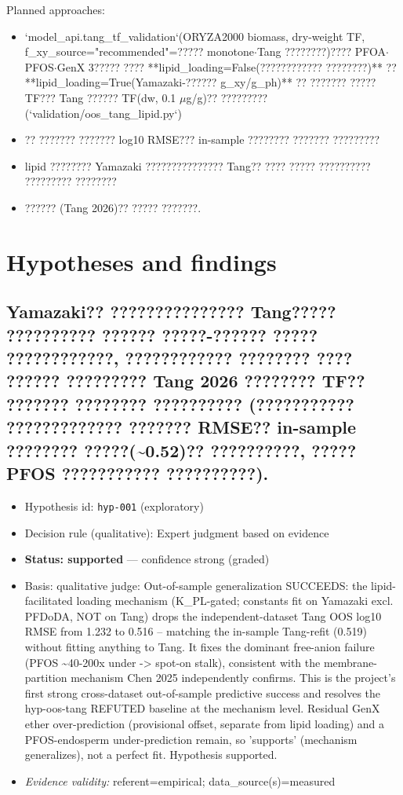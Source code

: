 \documentclass{article}
\begin{document}
Planned approaches:
\begin{itemize}
  \item `model\_api.tang\_tf\_validation`(ORYZA2000 biomass, dry-weight TF, f\_xy\_source="recommended"=?????
monotone$\cdot$Tang ????????)???? PFOA$\cdot$PFOS$\cdot$GenX 3????? ???? **lipid\_loading=False(???????????? ????????)** ??
**lipid\_loading=True(Yamazaki-?????? g\_xy/g\_ph)** ?? ??????? ????? TF??? Tang ?????? TF(dw, 0.1 $\mu$g/g)??
?????????(`validation/oos\_tang\_lipid.py`)
  \item ?? ??????? ??????? log10 RMSE??? in-sample ???????? ???????
?????????
  \item lipid ???????? Yamazaki ??????????????? Tang?? ???? ????? ?????????? ????????? ????????
  \item ??????
(Tang 2026)?? ????? ???????.
\end{itemize}

\section{Hypotheses and findings}

\subsection{Yamazaki?? ??????????????? Tang????? ?????????? ?????? ?????-?????? ????? ????????????, ???????????? ???????? ????
?????? ????????? Tang 2026 ???????? TF?? ??????? ???????? ?????????? (??????????? ????????????? ??????? RMSE??
in-sample ???????? ?????(\textasciitilde{}0.52)?? ??????????, ????? PFOS ??????????? ??????????).}
\begin{itemize}
  \item Hypothesis id: \texttt{hyp-001} (exploratory)
  \item Decision rule (qualitative): Expert judgment based on evidence
  \item \textbf{Status: supported} --- confidence strong (graded)
  \item Basis: qualitative judge: Out-of-sample generalization SUCCEEDS: the lipid-facilitated loading mechanism (K\_PL-gated; constants fit on Yamazaki excl. PFDoDA, NOT on Tang) drops the independent-dataset Tang OOS log10 RMSE from 1.232 to 0.516 -- matching the in-sample Tang-refit (0.519) without fitting anything to Tang. It fixes the dominant free-anion failure (PFOS \textasciitilde{}40-200x under -> spot-on stalk), consistent with the membrane-partition mechanism Chen 2025 independently confirms. This is the project's first strong cross-dataset out-of-sample predictive success and resolves the hyp-oos-tang REFUTED baseline at the mechanism level. Residual GenX ether over-prediction (provisional offset, separate from lipid loading) and a PFOS-endosperm under-prediction remain, so 'supports' (mechanism generalizes), not a perfect fit. Hypothesis supported.
  \item \textit{Evidence validity:} referent=empirical; data\_source(s)=measured
\end{itemize}
\end{document}
